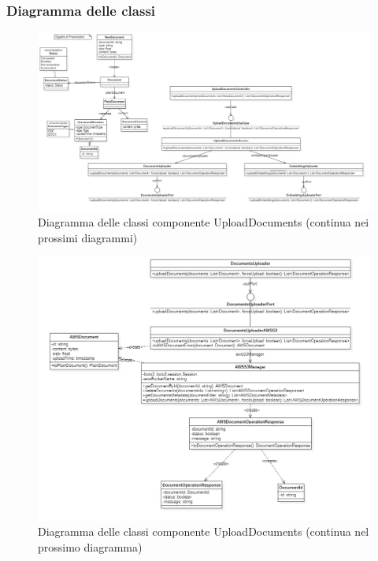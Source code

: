 \documentclass[10pt, a4paper]{article}
\begin{document}
\subsubsection{Diagramma delle classi}
\vspace{3em}

\begin{figure}[H]
    \centering        
    \includegraphics[width=17cm]{img/UploadDocs0.png}
    \caption{Diagramma delle classi componente UploadDocuments (continua nei prossimi diagrammi)}
\end{figure}
\vspace{3em}
\begin{figure}[H]
    \centering        
    \includegraphics[width=15cm]{img/UploadDocs1.png}
    \caption{Diagramma delle classi componente UploadDocuments (continua nel prossimo diagramma)}
\end{figure}
\vspace{3em}
\end{document}
